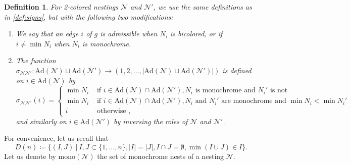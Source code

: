 \documentclass[twoside, 12pt]{amsart}
\newtheorem{definition}{Definition}[section]
\theoremstyle{remark}
\newcommand{\mono}{\ensuremath{\mathrm{mono}}}
\begin{document}
\begin{definition} For 2-colored nestings $\mathcal{N}$ and $\mathcal{N}'$, we use the same definitions as in \cref{def:signs}, but with the following two modifications:
\begin{enumerate}[leftmargin=*]
\item[(2)] We say that an edge $i$ of $g$ is \emph{admissible} when $N_i$ is bicolored, or if $i \neq \min N_i$ when $N_i$ is monochrome. 
\item[(4)] The function $\sigma_{\mathcal{N}\mathcal{N}'}: \mathrm{Ad}(\mathcal{N})\sqcup \mathrm{Ad}(\mathcal{N}') \to (1,2,\ldots,|\mathrm{Ad}(\mathcal{N})\sqcup \mathrm{Ad}(\mathcal{N}')|)$ is defined on $i \in \mathrm{Ad}(\mathcal{N})$ by 
\begin{equation*}
  \sigma_{\mathcal{N}\mathcal{N}'}(i)= 
  \begin{cases}
    \min N_i & \text{ if } i \in \mathrm{Ad}(\mathcal{N})\cap \mathrm{Ad}(\mathcal{N}') , N_i \text{ is monochrome and } N_i' \text{ is not} \\
    \min N_i & \text{ if } i \in \mathrm{Ad}(\mathcal{N})\cap \mathrm{Ad}(\mathcal{N}'), N_i \text{ and } N_i' \text{ are monochrome and } \min N_i < \min N_i' \\ 
    i & \text{ otherwise ,} 
  \end{cases}
\end{equation*}
and similarly on $i \in \mathrm{Ad}(\mathcal{N}')$ by inversing the roles of $\mathcal{N}$ and $\mathcal{N}'$.
\end{enumerate}
\end{definition}

For convenience, let us recall that \[ D(n)\coloneqq \{(I,J) \ | \ I,J\subset\{1,\ldots,n\}, |I|=|J|, I\cap J=\emptyset, \min(I\cup J)\in I \}. \]
Let us denote by $\mono(\mathcal{N})$ the set of monochrome nests of a nesting $\mathcal{N}$.
\end{document}
